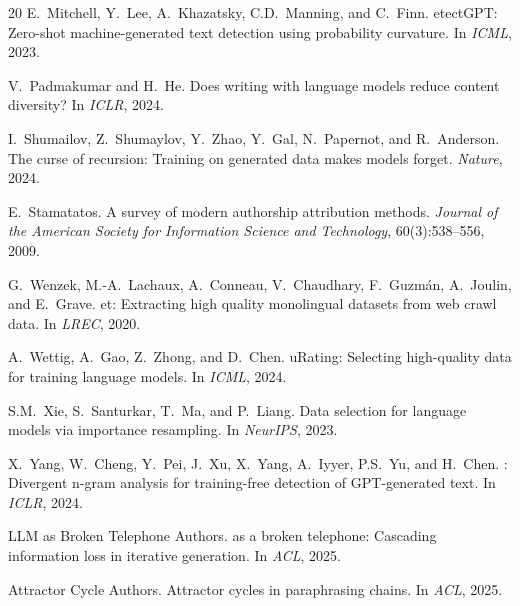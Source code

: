 \documentclass[11pt,a4paper]{article}
\begin{document}
\begin{thebibliography}{20}
E.~Mitchell, Y.~Lee, A.~Khazatsky, C.D.~Manning, and C.~Finn.
etect{GPT}: Zero-shot machine-generated text detection using probability curvature.
\newblock In \emph{ICML}, 2023.

V.~Padmakumar and H.~He.
\newblock Does writing with language models reduce content diversity?
\newblock In \emph{ICLR}, 2024.

I.~Shumailov, Z.~Shumaylov, Y.~Zhao, Y.~Gal, N.~Papernot, and R.~Anderson.
\newblock The curse of recursion: Training on generated data makes models forget.
\newblock \emph{Nature}, 2024.

E.~Stamatatos.
\newblock A survey of modern authorship attribution methods.
\newblock \emph{Journal of the American Society for Information Science and Technology}, 60(3):538--556, 2009.

G.~Wenzek, M.-A.~Lachaux, A.~Conneau, V.~Chaudhary, F.~Guzm\'{a}n, A.~Joulin, and E.~Grave.
et: Extracting high quality monolingual datasets from web crawl data.
\newblock In \emph{LREC}, 2020.

A.~Wettig, A.~Gao, Z.~Zhong, and D.~Chen.
u{R}ating: Selecting high-quality data for training language models.
\newblock In \emph{ICML}, 2024.

S.M.~Xie, S.~Santurkar, T.~Ma, and P.~Liang.
\newblock Data selection for language models via importance resampling.
\newblock In \emph{NeurIPS}, 2023.

X.~Yang, W.~Cheng, Y.~Pei, J.~Xu, X.~Yang, A.~Iyyer, P.S.~Yu, and H.~Chen.
: Divergent n-gram analysis for training-free detection of {GPT}-generated text.
\newblock In \emph{ICLR}, 2024.

{LLM as Broken Telephone Authors}.
 as a broken telephone: Cascading information loss in iterative generation.
\newblock In \emph{ACL}, 2025.

{Attractor Cycle Authors}.
\newblock Attractor cycles in paraphrasing chains.
\newblock In \emph{ACL}, 2025.

\end{thebibliography}
\end{document}
